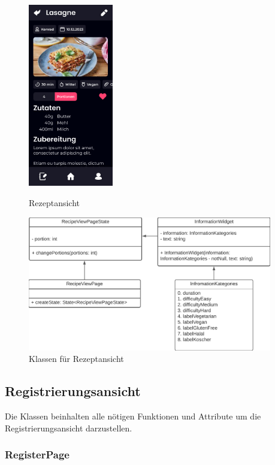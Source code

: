 \documentclass[parskip=full]{scrartcl}
\begin{document}
\begin{figure}[htp]
    \begin{minipage}
        [t]{0.49\textwidth}
        \centering
        \includegraphics[height=80mm]{images/Presentation-layer/RecipeView.jpg}
        \caption{Rezeptansicht}
    \end{minipage}
    \begin{minipage}
        [t]{0.49\textwidth}
        \centering
        \includegraphics[width=0.95\textwidth]{images/Presentation-layer/RecipeViewClass.png}
        \caption{Klassen für Rezeptansicht}
    \end{minipage}
\end{figure}

\newpage

\subsection{Registrierungsansicht}
Die Klassen beinhalten alle nötigen Funktionen und Attribute um die Registrierungsansicht darzustellen.

\subsubsection{RegisterPage}
\end{document}
